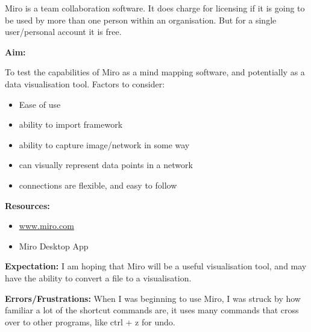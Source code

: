 \documentclass{article}
\begin{document}
Miro is a team collaboration software. 
It does charge for licensing if it is going to be used by more than one person within an organisation. But for a single user/personal account it is free.

\textbf{Aim:}

To test the capabilities of Miro as a mind mapping software, and potentially as a data visualisation tool. Factors to consider:

\begin{itemize}
    \item Ease of use
    \item ability to import framework
    \item ability to capture image/network in some way
    \item can visually represent data points in a network
    \item connections are flexible, and easy to follow
\end{itemize}

\textbf{Resources:}
\begin{itemize}
    \item \url{www.miro.com}
    \item Miro Desktop App
\end{itemize}

\textbf{Expectation:}
I am hoping that Miro will be a useful visualisation tool, and may have the ability to convert a file to a visualisation. 


\label{Error: Miro Errors/Frustrations}
\textbf{Errors/Frustrations:}
When I was beginning to use Miro, I was struck by how familiar a lot of the shortcut commands are, it uses many commands that cross over to other programs, like ctrl + z for undo.
\end{document}

